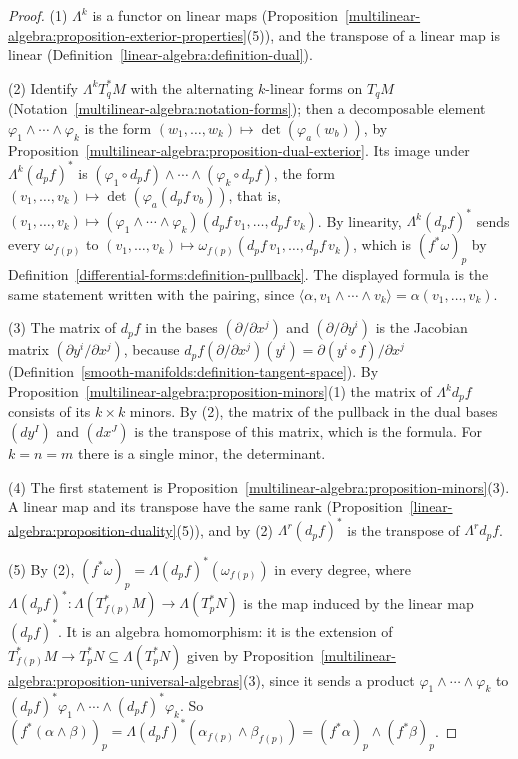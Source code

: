 \begin{proof}
(1) $\Lambda^k$ is a functor on linear maps (Proposition~\ref{multilinear-algebra:proposition-exterior-properties}(5)), and the transpose of a linear map is linear
(Definition~\ref{linear-algebra:definition-dual}).

(2) Identify $\Lambda^kT^*_qM$ with the alternating $k$-linear forms on $T_qM$ (Notation~\ref{multilinear-algebra:notation-forms}); then a decomposable element $\varphi_1 \wedge \cdots \wedge \varphi_k$
is the form $(w_1, \ldots, w_k) \mapsto \det(\varphi_a(w_b))$, by Proposition~\ref{multilinear-algebra:proposition-dual-exterior}. Its image under $\Lambda^k(d_pf)^*$ is
$(\varphi_1 \circ d_pf) \wedge \cdots \wedge (\varphi_k \circ d_pf)$, the form $(v_1, \ldots, v_k) \mapsto \det(\varphi_a(d_pf\,v_b))$, that is,
$(v_1, \ldots, v_k) \mapsto (\varphi_1 \wedge \cdots \wedge \varphi_k)(d_pf\,v_1, \ldots, d_pf\,v_k)$. By linearity, $\Lambda^k(d_pf)^*$ sends every $\omega_{f(p)}$ to
$(v_1, \ldots, v_k) \mapsto \omega_{f(p)}(d_pf\,v_1, \ldots, d_pf\,v_k)$, which is $(f^*\omega)_p$ by Definition~\ref{differential-forms:definition-pullback}. The displayed formula is the same
statement written with the pairing, since $\langle\alpha, v_1 \wedge \cdots \wedge v_k\rangle = \alpha(v_1, \ldots, v_k)$.

(3) The matrix of $d_pf$ in the bases $(\partial/\partial x^j)$ and $(\partial/\partial y^i)$ is the Jacobian matrix $(\partial y^i/\partial x^j)$, because
$d_pf(\partial/\partial x^j)(y^i) = \partial(y^i \circ f)/\partial x^j$ (Definition~\ref{smooth-manifolds:definition-tangent-space}). By
Proposition~\ref{multilinear-algebra:proposition-minors}(1) the matrix of $\Lambda^kd_pf$ consists of its $k \times k$ minors. By (2), the matrix of the pullback in the dual bases $(dy^I)$ and
$(dx^J)$ is the transpose of this matrix, which is the formula. For $k = n = m$ there is a single minor, the determinant.

(4) The first statement is Proposition~\ref{multilinear-algebra:proposition-minors}(3). A linear map and its transpose have the same rank (Proposition~\ref{linear-algebra:proposition-duality}(5)),
and by (2) $\Lambda^r(d_pf)^*$ is the transpose of $\Lambda^rd_pf$.

(5) By (2), $(f^*\omega)_p = \Lambda(d_pf)^*(\omega_{f(p)})$ in every degree, where $\Lambda(d_pf)^* \colon \Lambda(T^*_{f(p)}M) \to \Lambda(T^*_pN)$ is the map induced by
the linear map $(d_pf)^*$. It is an algebra homomorphism: it is the extension of $T^*_{f(p)}M \to T^*_pN \subseteq \Lambda(T^*_pN)$ given by
Proposition~\ref{multilinear-algebra:proposition-universal-algebras}(3), since it sends a product $\varphi_1 \wedge \cdots \wedge \varphi_k$ to $(d_pf)^*\varphi_1 \wedge \cdots \wedge (d_pf)^*\varphi_k$. So
$(f^*(\alpha \wedge \beta))_p = \Lambda(d_pf)^*(\alpha_{f(p)} \wedge \beta_{f(p)}) = (f^*\alpha)_p \wedge (f^*\beta)_p$.
\end{proof}

